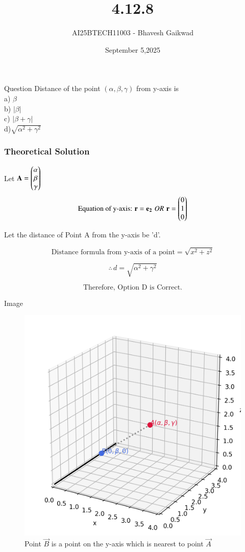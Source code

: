 \documentclass{beamer}
\title
{4.12.8}
\date{September 5,2025}
\author 
{AI25BTECH11003 - Bhavesh Gaikwad}
\begin{document}
\frame{\titlepage}
\begin{frame}{Question}
Distance of the point $(\alpha, \beta, \gamma)$ from y-axis is\\
a) $\beta$\\
b) $|\beta|$\\
c) $|\beta + \gamma|$\\
d)$\sqrt{\alpha^2 + \gamma^2}$ \\
\end{frame}


\begin{frame}[fragile]
    \frametitle{Theoretical Solution}
Let $\mathbf{A} = \begin{pmatrix}\alpha \\ \beta \\ \gamma\end{pmatrix}$\\ 


\begin{equation}
    \text{Equation of y-axis: } \mathbf{r} = \mathbf{e_2} \, \,
    OR \, \, \mathbf{r}=\begin{pmatrix}0 \\ 1 \\ 0\end{pmatrix}
\end{equation}

Let the distance of Point A from the y-axis be 'd'.

\begin{equation}
    \text{Distance formula from y-axis of a point} = \sqrt{x^2 + z^2} 
\end{equation} 

\begin{equation}
\therefore \, d = \sqrt{\alpha^2 + \gamma^2}    
\end{equation}

\begin{equation}
\boxed{\text{Therefore, Option D is Correct.}}    
\end{equation}
\end{frame}

\begin{frame}{Image}
\begin{figure}
   \centering
    \includegraphics[width=\columnwidth, height=0.7\textheight, keepaspectratio]{figs/fig1.png}
    \caption{Point $\vec{B}$ is a point on the y-axis which is nearest to point $\vec{A}$}
    \label{fig:Beamer/figs/fig1.png}
\end{figure}
\end{frame}
\end{document}
